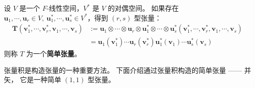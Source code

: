 \begin{definition}
    设 $V$ 是一个 $F$-线性空间，$V^*$ 是 $V$ 的对偶空间。
    如果存在 $\mathbf{u}_1,\cdots,\mathbf{u}_r\in V,\ \mathbf{u}_1^*,\cdots,\mathbf{u}_s^*\in V^*$，得到 $(r,s)$ 型张量：
    \begin{align*}
        \mathbf{T}(\mathbf{v}_1^*,\cdots,\mathbf{v}_r^*,\mathbf{v}_1,\cdots,\mathbf{v}_s) &:= \mathbf{u}_1\otimes \cdots \otimes\mathbf{u}_r \otimes \mathbf{u}_1^*\otimes \cdots \otimes\mathbf{u}_s^* (\mathbf{v}_1^*,\cdots,\mathbf{v}_r^*,\mathbf{v}_1,\cdots,\mathbf{v}_s)\\
        &=\mathbf{u}_1(\mathbf{v}_1^*)\cdots\mathbf{u}_r(\mathbf{v}_r^*)\mathbf{u}_1^*(\mathbf{v}_1)\cdots\mathbf{u}_s^*(\mathbf{v}_s)
    \end{align*}
    则称 $T$ 为一个\textbf{简单张量}。
\end{definition}

\begin{note}
    张量积是构造张量的一种重要方法。
    下面介绍通过张量积构造的简单张量 —— 并矢，
    它是一种简单 $(1,1)$ 型张量。
\end{note}
\vspace{1em}

